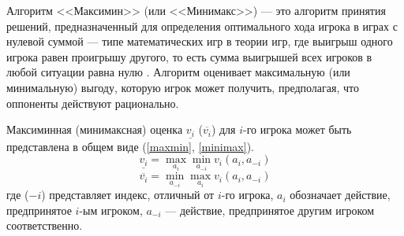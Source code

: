 Алгоритм <<Максимин>> (или <<Минимакс>>) --- это алгоритм принятия решений, предназначенный для определения оптимального хода игрока в играх с нулевой суммой --- типе математических игр в теории игр, где выигрыш одного игрока равен проигрышу другого, то есть сумма выигрышей всех игроков в любой ситуации равна нулю \cite{zero-sum-games}. Алгоритм оценивает максимальную (или минимальную) выгоду, которую игрок может получить, предполагая, что оппоненты действуют рационально.

Максиминная (минимаксная) оценка $\underline{v_i}$ ($\overline{v_i}$) для $i$-го игрока может быть представлена в общем виде (\ref{maxmin}, \ref{minimax}).
\begin{equation}\label{maxmin}
    \underline{v_i} = \max_{a_i} \min_{a_{-i}} v_i(a_i, a_{-i})
\end{equation}
\begin{equation}\label{minimax}
    \overline{v_i} = \min_{a_{-i}} \max_{a_i} v_i(a_i, a_{-i})
\end{equation}
где ($-i$) представляет индекс, отличный от $i$-го игрока, $a_i$ обозначает действие, предпринятое $i$-ым игроком, $a_{-i}$ --- действие, предпринятое другим игроком соответственно.
